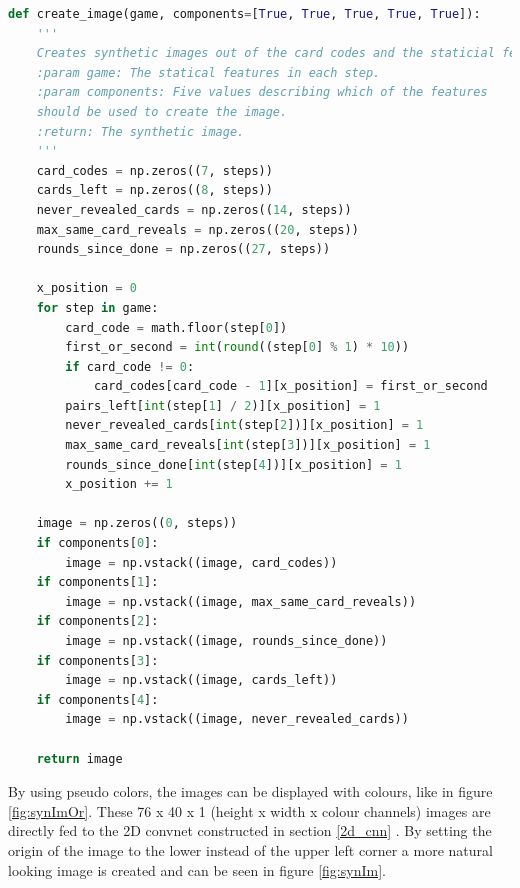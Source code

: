 \begin{lstlisting}[language=python, caption=Code for creating a synthetic image \\from the statistical features., xleftmargin=5.0ex]
def create_image(game, components=[True, True, True, True, True]):
	'''
	Creates synthetic images out of the card codes and the staticial features.
	:param game: The statical features in each step. 
	:param components: Five values describing which of the features 
	should be used to create the image. 
	:return: The synthetic image.
	'''
	card_codes = np.zeros((7, steps))
	cards_left = np.zeros((8, steps))
	never_revealed_cards = np.zeros((14, steps))
	max_same_card_reveals = np.zeros((20, steps))
	rounds_since_done = np.zeros((27, steps))
	
	x_position = 0
	for step in game:
		card_code = math.floor(step[0])
		first_or_second = int(round((step[0] % 1) * 10))
		if card_code != 0:
			card_codes[card_code - 1][x_position] = first_or_second 
		pairs_left[int(step[1] / 2)][x_position] = 1
		never_revealed_cards[int(step[2])][x_position] = 1
		max_same_card_reveals[int(step[3])][x_position] = 1
		rounds_since_done[int(step[4])][x_position] = 1
		x_position += 1
	
	image = np.zeros((0, steps))
	if components[0]:   
		image = np.vstack((image, card_codes))
	if components[1]:
		image = np.vstack((image, max_same_card_reveals))
	if components[2]:  
		image = np.vstack((image, rounds_since_done))
	if components[3]:
		image = np.vstack((image, cards_left))
	if components[4]:   
		image = np.vstack((image, never_revealed_cards))
	
	return image
\end{lstlisting}

\newpage

By using pseudo colors, the images can be displayed with colours, like in figure \ref{fig:synImOr}. These 76 x 40 x 1 (height x width x colour channels) images are directly fed to the 2D convnet constructed in section \ref{2d_cnn} . By setting the origin of the image to the lower instead of the upper left corner a more natural looking image is created and can be seen in figure \ref{fig:synIm}. 

